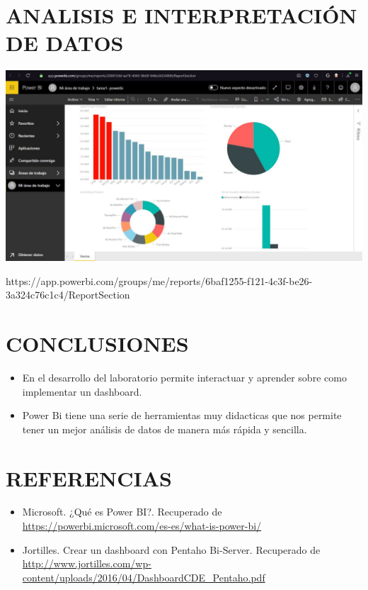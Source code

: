 \documentclass[12pt,letterpaper]{article}
\begin{document}
\section{ANALISIS E INTERPRETACIÓN DE DATOS}

	\begin{center}
	\includegraphics[width=16cm]{./Imagenes/img}
	\end{center}
\par https://app.powerbi.com/groups/me/reports/6baf1255-f121-4c3f-be26-3a324c76c1c4/ReportSection
\section{CONCLUSIONES}
\begin{itemize}
	\item En el desarrollo del laboratorio permite interactuar y aprender sobre como implementar un dashboard.
	\item Power Bi tiene una serie de herramientas muy didacticas que nos permite tener un mejor análisis de datos de manera más rápida y sencilla.
\end{itemize}
\section{REFERENCIAS}
\begin{itemize}
	\item Microsoft. ¿Qué es Power BI?. Recuperado de \url{https://powerbi.microsoft.com/es-es/what-is-power-bi/}
	\item Jortilles. Crear un dashboard con Pentaho Bi-Server. Recuperado de \url{http://www.jortilles.com/wp-content/uploads/2016/04/DashboardCDE_Pentaho.pdf}

\end{itemize}
\end{document}

